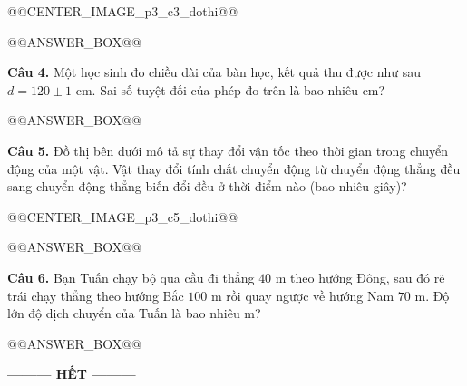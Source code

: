 \documentclass[11pt,a4paper]{article}
\begin{document}
@@CENTER_IMAGE_p3_c3_dothi@@

@@ANSWER_BOX@@

\textbf{Câu 4.} Một học sinh đo chiều dài của bàn học, kết quả thu được như sau $d = 120 \pm 1\text{ cm}$. Sai số tuyệt đối của phép đo trên là bao nhiêu cm?

@@ANSWER_BOX@@

\textbf{Câu 5.} Đồ thị bên dưới mô tả sự thay đổi vận tốc theo thời gian trong chuyển động của một vật. Vật thay đổi tính chất chuyển động từ chuyển động thẳng đều sang chuyển động thẳng biến đổi đều ở thời điểm nào (bao nhiêu giây)?

@@CENTER_IMAGE_p3_c5_dothi@@

@@ANSWER_BOX@@

\textbf{Câu 6.} Bạn Tuấn chạy bộ qua cầu đi thẳng $40\text{ m}$ theo hướng Đông, sau đó rẽ trái chạy thẳng theo hướng Bắc $100\text{ m}$ rồi quay ngược về hướng Nam $70\text{ m}$. Độ lớn độ dịch chuyển của Tuấn là bao nhiêu m?

@@ANSWER_BOX@@

\vspace{0.4cm}
\begin{center}
\textbf{--------- HẾT ---------}
\end{center}
\end{document}
